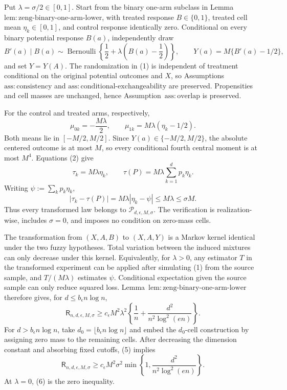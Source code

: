 Put \(\lambda=\sigma/2\in[0,1]\).  Start from the binary one-arm subclass in Lemma~\(\mathrm{lem:zeng\text{-}binary\text{-}one\text{-}arm\text{-}lower}\), with treated response \(B\in\{0,1\}\), treated cell mean \(\eta_k\in[0,1]\), and control response identically zero.  Conditional on every binary potential response \(B(a)\), independently draw
\[
 B'(a)\mid B(a)\sim\operatorname{Bernoulli}\!\left\{\frac12+\lambda\left(B(a)-\frac12\right)\right\},
 \qquad Y(a)=M\{B'(a)-1/2\},
\tag{1}
\]
and set \(Y=Y(A)\).  The randomization in (1) is independent of treatment conditional on the original potential outcomes and \(X\), so Assumptions~\(\mathrm{ass:consistency}\) and \(\mathrm{ass:conditional\text{-}exchangeability}\) are preserved.  Propensities and cell masses are unchanged, hence Assumption~\(\mathrm{ass:overlap}\) is preserved.

For the control and treated arms, respectively,
\[
 \mu_{0k}=-\frac{M\lambda}{2},
 \qquad
 \mu_{1k}=M\lambda(\eta_k-1/2).
\tag{2}
\]
Both means lie in \([-M/2,M/2]\).  Since \(Y(a)\in\{-M/2,M/2\}\), the absolute centered outcome is at most \(M\), so every conditional fourth central moment is at most \(M^4\).  Equations (2) give
\[
 \tau_k=M\lambda\eta_k,
 \qquad
 \tau(P)=M\lambda\sum_{k=1}^dp_k\eta_k.
\tag{3}
\]
Writing \(\psi:=\sum_kp_k\eta_k\),
\[
 |\tau_k-\tau(P)|=M\lambda|\eta_k-\psi|\le M\lambda\le\sigma M.
\tag{4}
\]
Thus every transformed law belongs to \(\mathcal P_{d,\epsilon,M,\sigma}\).  The verification is realization-wise, includes \(\sigma=0\), and imposes no condition on zero-mass cells.

The transformation from \((X,A,B)\) to \((X,A,Y)\) is a Markov kernel identical under the two fuzzy hypotheses.  Total variation between the induced mixtures can only decrease under this kernel.  Equivalently, for \(\lambda>0\), any estimator \(T\) in the transformed experiment can be applied after simulating (1) from the source sample, and \(T/(M\lambda)\) estimates \(\psi\).  Conditional expectation given the source sample can only reduce squared loss.  Lemma~\(\mathrm{lem:zeng\text{-}binary\text{-}one\text{-}arm\text{-}lower}\) therefore gives, for \(d\le b_{\epsilon}n\log n\),
\[
 \mathsf R_{n,d,\epsilon,M,\sigma}
 \ge c_{\epsilon}M^2\lambda^2\left\{\frac1n+\frac{d^2}{n^2\log^2(en)}\right\}.
\tag{5}
\]
For \(d>b_{\epsilon}n\log n\), take \(d_0=\lfloor b_{\epsilon}n\log n\rfloor\) and embed the \(d_0\)-cell construction by assigning zero mass to the remaining cells.  After decreasing the dimension constant and absorbing fixed cutoffs, (5) implies
\[
 \mathsf R_{n,d,\epsilon,M,\sigma}
 \ge c_{\epsilon}M^2\sigma^2
 \min\left\{1,\frac{d^2}{n^2\log^2(en)}\right\}.
\tag{6}
\]
At \(\lambda=0\), (6) is the zero inequality.

